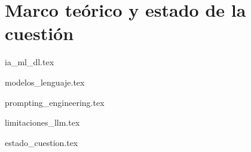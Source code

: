 \chapter{Marco teórico y estado de la cuestión}



{ia_ml_dl.tex}

{modelos_lenguaje.tex}

{prompting_engineering.tex}

{limitaciones_llm.tex}

{estado_cuestion.tex} 








